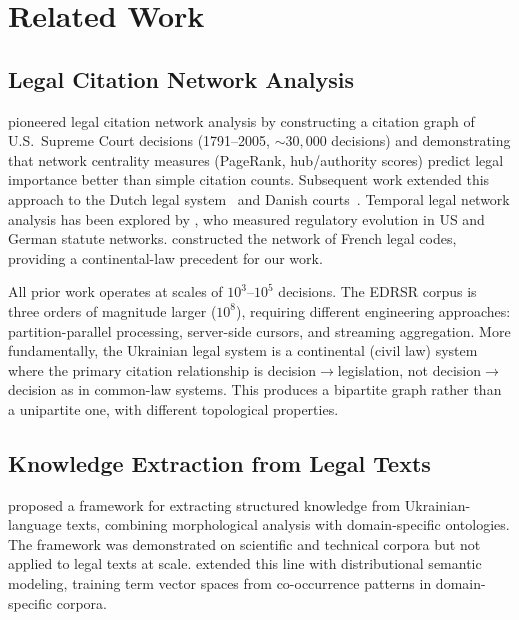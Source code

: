 \documentclass[11pt]{article}
\begin{document}
\section{Related Work}
\label{sec:related}

\subsection{Legal Citation Network Analysis}

\citet{fowler2007network} pioneered legal citation network analysis by constructing a citation graph of U.S.\ Supreme Court decisions (1791--2005, ${\sim}30{,}000$ decisions) and demonstrating that network centrality measures (PageRank, hub/authority scores) predict legal importance better than simple citation counts.
Subsequent work extended this approach to the Dutch legal system~\citep{winkels2011determining,geist2009using} and Danish courts~\citep{mones2021emergence}.
Temporal legal network analysis has been explored by \citet{coupette2021measuring}, who measured regulatory evolution in US and German statute networks.
\citet{mazzega2009network} constructed the network of French legal codes, providing a continental-law precedent for our work.

All prior work operates at scales of $10^3$--$10^5$ decisions.
The EDRSR corpus is three orders of magnitude larger ($10^8$), requiring different engineering approaches: partition-parallel processing, server-side cursors, and streaming aggregation.
More fundamentally, the Ukrainian legal system is a continental (civil law) system where the primary citation relationship is decision$\to$legislation, not decision$\to$decision as in common-law systems.
This produces a bipartite graph rather than a unipartite one, with different topological properties.

\subsection{Knowledge Extraction from Legal Texts}

\citet{palagin2012knowledge} proposed a framework for extracting structured knowledge from Ukrainian-language texts, combining morphological analysis with domain-specific ontologies.
The framework was demonstrated on scientific and technical corpora but not applied to legal texts at scale.
\citet{palagin2020distributional} extended this line with distributional semantic modeling, training term vector spaces from co-occurrence patterns in domain-specific corpora.
\end{document}
